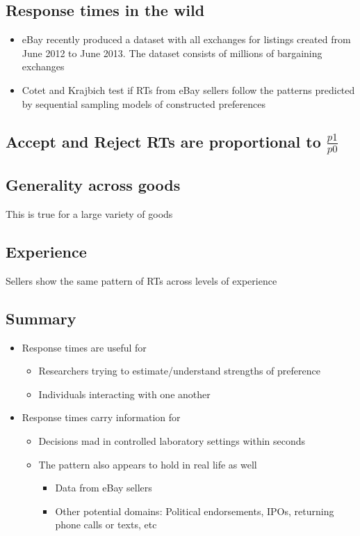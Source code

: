 \subsection{Response times in the wild}
\begin{itemize}
    \item eBay recently produced a dataset with all exchanges for listings created from June 2012 to June 2013. The dataset consists of millions of bargaining exchanges
    \item Cotet and Krajbich test if RTs from eBay sellers follow the patterns predicted by sequential sampling models of constructed preferences
\end{itemize}
\subsection{Accept and Reject RTs are proportional to $\frac{p1}{p0}$}
\subsection{Generality across goods}
This is true for a large variety of goods
\subsection{Experience}
Sellers show the same pattern of RTs across levels of experience
\subsection{Summary}
\begin{itemize}
    \item Response times are useful for
    \begin{itemize}
        \item Researchers trying to estimate/understand strengths of preference
        \item Individuals interacting with one another
    
    \end{itemize}
    \item Response times carry information for
    \begin{itemize}
        \item Decisions mad in controlled laboratory settings within seconds
        \item The pattern also appears to hold in real life as well
        \begin{itemize}
            \item Data from eBay sellers
            \item Other potential domains: Political endorsements, IPOs, returning phone calls or texts, etc
        \end{itemize}
    \end{itemize}
\end{itemize}
